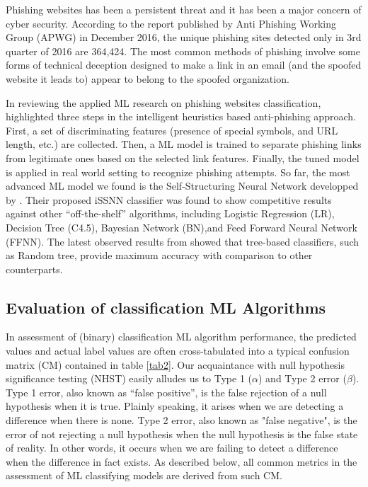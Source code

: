 \documentclass[deca,nonblindrev]{informs3} %
\begin{document}
Phishing websites has been a persistent threat and it has been a major concern of cyber security.  According to the report published by Anti Phishing Working Group (APWG) in December 2016, the unique phishing sites detected only in 3rd quarter of 2016 are 364,424. The most common methods of phishing involve some forms of technical deception designed to make a link in an email (and the spoofed website it leads to) appear to belong to the spoofed organization. 

In reviewing the applied ML research on phishing websites classification,   \cite{Mohammad2015a} highlighted three steps in the intelligent  heuristics  based  anti-phishing approach.  First, a set of discriminating features (presence of special symbols, and URL length, etc.) are collected. Then,  a ML model is trained to separate phishing links from legitimate ones based on the selected link features. Finally, the tuned model is applied in real world setting to recognize phishing attempts.  So far, the most advanced ML model we found is the Self-Structuring Neural Network developped by \cite{7727750}. Their proposed iSSNN classifier was found to show competitive results against other ``off-the-shelf'' algorithms, including Logistic Regression (LR), Decision Tree (C4.5), Bayesian Network (BN),and  Feed Forward Neural Network (FFNN).
The latest observed results from \cite{10.1007/978-981-10-5699-4_50}  showed that tree-based classifiers, such as Random tree,  provide maximum accuracy with comparison to other counterparts.

 



\subsection{Evaluation of classification  ML Algorithms}

In assessment of (binary) classification  ML algorithm performance, the predicted  values and actual label values  are often cross-tabulated into  a typical confusion matrix (CM) contained in  table \ref{tab2}. Our acquaintance with null hypothesis  significance  testing (NHST) easily alludes us to Type 1 ($\alpha$) and  Type 2 error ($\beta$). Type 1 error,  also known as “false positive”, is the false rejection of a null hypothesis when it is true. Plainly speaking, it arises when we are detecting a difference when there is none. Type 2  error, also known as "false negative", is the error of not rejecting a null hypothesis when the null hypothesis is the false state of reality. In other words, it occurs when we are failing to detect a difference when the difference in fact exists. As described below, all common metrics in the assessment of ML classifying models are derived from such CM.
\end{document}
